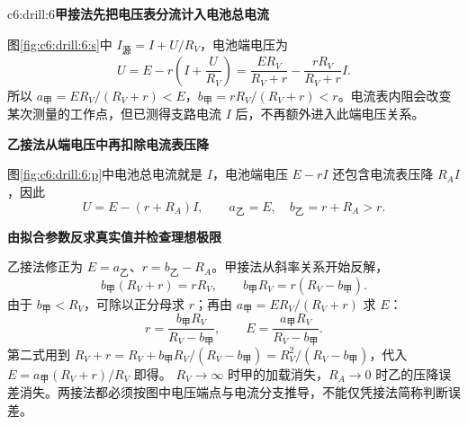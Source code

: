 \begin{drillsolution}{c6:drill:6}\textbf{甲接法先把电压表分流计入电池总电流}\par\nobreak

图\ref{fig:c6:drill:6:s}中 $I_{\text{源}}=I+U/R_V$，电池端电压为
\[
U=E-r\left(I+\frac U{R_V}\right)
=\frac{ER_V}{R_V+r}-\frac{rR_V}{R_V+r}I.
\]
所以 $a_{\text{甲}}=ER_V/(R_V+r)<E$，$b_{\text{甲}}=rR_V/(R_V+r)<r$。电流表内阻会改变某次测量的工作点，但已测得支路电流 $I$ 后，不再额外进入此端电压关系。


\par\medskip{}\noindent\textbf{乙接法从端电压中再扣除电流表压降}\par\nobreak


图\ref{fig:c6:drill:6:p}中电池总电流就是 $I$，电池端电压 $E-rI$ 还包含电流表压降 $R_AI$，因此
\[
U=E-(r+R_A)I,\qquad a_{\text{乙}}=E,\quad b_{\text{乙}}=r+R_A>r.
\]


\par\medskip{}\noindent\textbf{由拟合参数反求真实值并检查理想极限}\par\nobreak

乙接法修正为 $E=a_{\text{乙}}$、$r=b_{\text{乙}}-R_A$。甲接法从斜率关系开始反解，
\[
 b_{\text{甲}}(R_V+r)=rR_V,\qquad
 b_{\text{甲}}R_V=r(R_V-b_{\text{甲}}).
\]
由于 $b_{\text{甲}}<R_V$，可除以正分母求 $r$；再由 $a_{\text{甲}}=ER_V/(R_V+r)$ 求 $E$：
\[
r=\frac{b_{\text{甲}}R_V}{R_V-b_{\text{甲}}},\qquad
E=\frac{a_{\text{甲}}R_V}{R_V-b_{\text{甲}}}.
\]
第二式用到 $R_V+r=R_V+b_{\text{甲}}R_V/(R_V-b_{\text{甲}})=R_V^2/(R_V-b_{\text{甲}})$，代入 $E=a_{\text{甲}}(R_V+r)/R_V$ 即得。
$R_V\to\infty$ 时甲的加载消失，$R_A\to0$ 时乙的压降误差消失。两接法都必须按图中电压端点与电流分支推导，不能仅凭接法简称判断误差。
\end{drillsolution}
